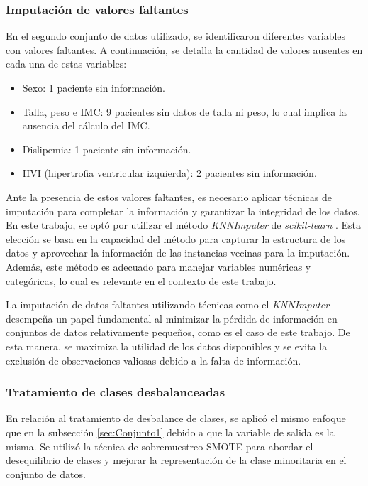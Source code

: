 \subsubsection{Imputación de valores faltantes}
En el segundo conjunto de datos utilizado, se identificaron diferentes variables con valores faltantes. 
A continuación, se detalla la cantidad de valores ausentes en cada una de estas variables:

\begin{itemize}
  \item Sexo: 1 paciente sin información.
  \item Talla, peso e IMC: 9 pacientes sin datos de talla ni peso, lo cual implica la ausencia del cálculo del IMC.
  \item Dislipemia: 1 paciente sin información.
  \item HVI (hipertrofia ventricular izquierda): 2 pacientes sin información.
\end{itemize}

Ante la presencia de estos valores faltantes, es necesario aplicar técnicas de imputación para completar 
la información y garantizar la integridad de los datos. En este trabajo, se optó por utilizar el método 
\emph{KNNImputer} de \emph{scikit-learn} \citep{CITE:50}. Esta elección se basa en la capacidad del método
para capturar la estructura de los datos y aprovechar la información de las instancias vecinas para la 
imputación. Además, este método es adecuado para manejar variables numéricas y categóricas, lo cual es 
relevante en el contexto de este trabajo.

La imputación de datos faltantes utilizando técnicas como el \emph{KNNImputer} desempeña un papel fundamental 
al minimizar la pérdida de información en conjuntos de datos relativamente pequeños, 
como es el caso de este trabajo. De esta manera, se maximiza la utilidad de los datos disponibles y se evita la exclusión 
de observaciones valiosas debido a la falta de información.


\subsubsection{Tratamiento de clases desbalanceadas}

En relación al tratamiento de desbalance de clases, se aplicó el mismo enfoque que en la subsección 
\ref{sec:Conjunto1} debido a que la variable de salida es la misma. Se utilizó la técnica de sobremuestreo 
SMOTE para abordar el desequilibrio de clases y mejorar la representación de la clase minoritaria en el conjunto de datos. 

